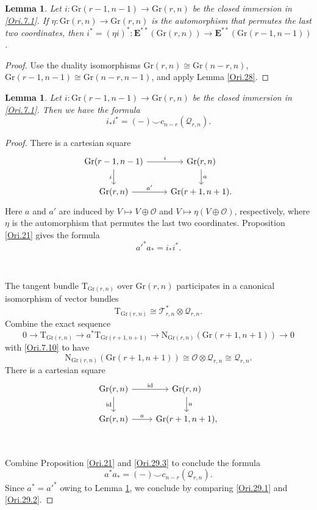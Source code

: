 \documentclass[11pt, a4paper]{amsart}
\newtheorem{lem}[thm]{Lemma}
\theoremstyle{definition}
\numberwithin{equation}{subsection}
\newcommand{\id}{\operatorname{id}}   			%
\newcommand{\Normal}{{\mathrm{N}}}
\newcommand{\Tangent}{{\mathrm{T}}}
\newcommand{\Gr}{{\mathrm{Gr}}}
\newcommand{\cO}{\mathcal{O}}
\newcommand{\cQ}{\mathcal{Q}}
\newcommand{\cT}{\mathcal{T}}
\newcommand{\ringE}{\mathbf{E}}
\begin{document}
\begin{lem}
\label{Ori.31}
Let $i\colon \Gr(r-1,n-1)\to \Gr(r,n)$ be the closed immersion in \eqref{Ori.7.1}.
If $\eta\colon \Gr(r,n)\to \Gr(r,n)$ is the automorphism that permutes the last two coordinates, 
then $i^*=(\eta i)^*\colon \ringE^{**}(\Gr(r,n))\to \ringE^{**}(\Gr(r-1,n-1))$.
\end{lem}
\begin{proof}
Use the duality isomorphisms $\Gr(r,n)\cong \Gr(n-r,n)$, $\Gr(r-1,n-1)\cong \Gr(n-r,n-1)$, 
and apply Lemma \ref{Ori.28}.
\end{proof}

\begin{lem}
\label{Ori.29}
Let $i\colon \Gr(r-1,n-1)\to \Gr(r,n)$ be the closed immersion in \eqref{Ori.7.1}.
Then we have the formula
\[
i_*i^*
=
(-)\smile c_{n-r}(\cQ_{r,n}).
\]
\end{lem}
\begin{proof}
There is a cartesian square
\[
\begin{tikzcd}
\Gr(r-1,n-1)\ar[r,"i"]\ar[d,"i"']&
\Gr(r,n)\ar[d,"a"]
\\
\Gr(r,n)\ar[r,"a'"]&
\Gr(r+1,n+1).
\end{tikzcd}
\]
Here $a$ and $a'$ are induced by $V\mapsto V\oplus \cO$ and $V\mapsto \eta(V\oplus \cO)$, 
respectively, 
where $\eta$ is the automorphism that permutes the last two coordinates.
Proposition \ref{Ori.21} gives the formula
\begin{equation}
\label{Ori.29.1}
a'^*a_* = i_*i^*.
\end{equation}

\

The tangent bundle $\Tangent_{\Gr(r,n)}$ over $\Gr(r,n)$ participates in a canonical isomorphism of vector bundles
\[
\Tangent_{\Gr(r,n)}
\cong
\cT_{r,n}^*\otimes \cQ_{r,n}.
\]
Combine the exact sequence
\[
0
\to
\Tangent_{\Gr(r,n)}
\to
a^*\Tangent_{\Gr(r+1,n+1)}
\to
\Normal_{\Gr(r,n)}(\Gr(r+1,n+1))
\to
0
\]
with \eqref{Ori.7.10} to have
\begin{equation}
\label{Ori.29.3}
\Normal_{\Gr(r,n)}(\Gr(r+1,n+1))
\cong
\cO\otimes \cQ_{r,n}
\cong
\cQ_{r,n}.
\end{equation}
There is a cartesian square
\[
\begin{tikzcd}
\Gr(r,n)\ar[r,"\id"]\ar[d,"\id"']&
\Gr(r,n)\ar[d,"a"]
\\
\Gr(r,n)\ar[r,"a"]&
\Gr(r+1,n+1),
\end{tikzcd}
\]

\

Combine Proposition \ref{Ori.21} and \eqref{Ori.29.3} to conclude the formula
\begin{equation}
\label{Ori.29.2}
a^*a_*
=
(-)\smile c_{n-r}(\cQ_{r,n}).
\end{equation}
Since $a^*=a'^*$ owing to Lemma \ref{Ori.31}, 
we conclude by comparing \eqref{Ori.29.1} and \eqref{Ori.29.2}.
\end{proof}
\end{document}
